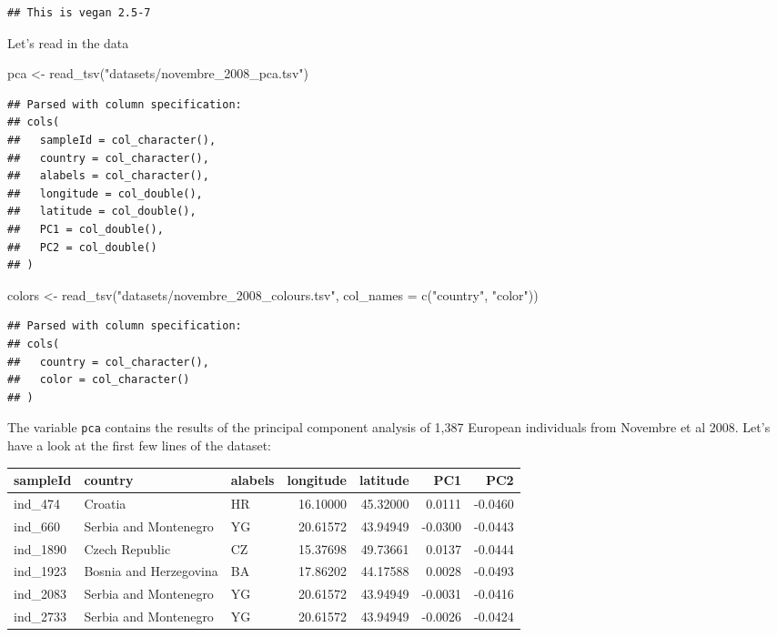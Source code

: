 \documentclass[
]{article}
\newenvironment{Shaded}{\begin{snugshade}}{\end{snugshade}}
\newcommand{\AttributeTok}[1]{\textcolor[rgb]{0.77,0.63,0.00}{#1}}
\newcommand{\FunctionTok}[1]{\textcolor[rgb]{0.00,0.00,0.00}{#1}}
\newcommand{\NormalTok}[1]{#1}
\newcommand{\OtherTok}[1]{\textcolor[rgb]{0.56,0.35,0.01}{#1}}
\newcommand{\StringTok}[1]{\textcolor[rgb]{0.31,0.60,0.02}{#1}}
\begin{document}
\begin{verbatim}
## This is vegan 2.5-7
\end{verbatim}

Let's read in the data

\begin{Shaded}
\begin{Highlighting}[]
\NormalTok{pca }\OtherTok{\textless{}{-}} \FunctionTok{read\_tsv}\NormalTok{(}\StringTok{"datasets/novembre\_2008\_pca.tsv"}\NormalTok{)}
\end{Highlighting}
\end{Shaded}

\begin{verbatim}
## Parsed with column specification:
## cols(
##   sampleId = col_character(),
##   country = col_character(),
##   alabels = col_character(),
##   longitude = col_double(),
##   latitude = col_double(),
##   PC1 = col_double(),
##   PC2 = col_double()
## )
\end{verbatim}

\begin{Shaded}
\begin{Highlighting}[]
\NormalTok{colors }\OtherTok{\textless{}{-}} \FunctionTok{read\_tsv}\NormalTok{(}\StringTok{"datasets/novembre\_2008\_colours.tsv"}\NormalTok{, }\AttributeTok{col\_names =} \FunctionTok{c}\NormalTok{(}\StringTok{"country"}\NormalTok{, }\StringTok{"color"}\NormalTok{))}
\end{Highlighting}
\end{Shaded}

\begin{verbatim}
## Parsed with column specification:
## cols(
##   country = col_character(),
##   color = col_character()
## )
\end{verbatim}

The variable \texttt{pca} contains the results of the principal
component analysis of 1,387 European individuals from Novembre et al
2008. Let's have a look at the first few lines of the dataset:

\begin{longtable}[]{@{}lllrrrr@{}}
\toprule
sampleId & country & alabels & longitude & latitude & PC1 & PC2 \\
\midrule
\endhead
ind\_474 & Croatia & HR & 16.10000 & 45.32000 & 0.0111 & -0.0460 \\
ind\_660 & Serbia and Montenegro & YG & 20.61572 & 43.94949 & -0.0300 &
-0.0443 \\
ind\_1890 & Czech Republic & CZ & 15.37698 & 49.73661 & 0.0137 &
-0.0444 \\
ind\_1923 & Bosnia and Herzegovina & BA & 17.86202 & 44.17588 & 0.0028 &
-0.0493 \\
ind\_2083 & Serbia and Montenegro & YG & 20.61572 & 43.94949 & -0.0031 &
-0.0416 \\
ind\_2733 & Serbia and Montenegro & YG & 20.61572 & 43.94949 & -0.0026 &
-0.0424 \\
\bottomrule
\end{longtable}
\end{document}
